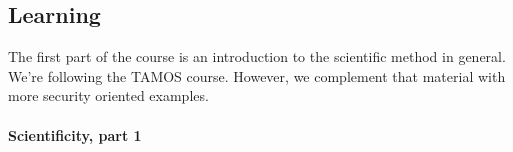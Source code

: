 %
%
%

\subsection{Learning}

The first part of the course is an introduction to the scientific method in 
general.
We're following the TAMOS course.
However, we complement that material with more security oriented examples.

\paragraph{Scientificity, part 1}


